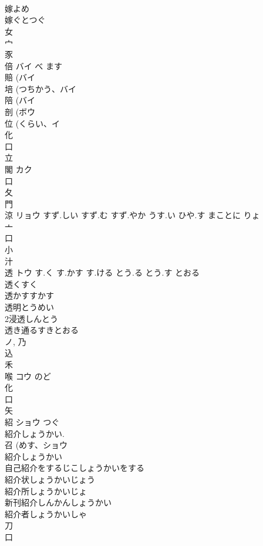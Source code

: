 \documentclass[8pt]{extreport}
\begin{document}
\begin{CJK}{UTF8}{min}
\\	嫁よめ
\\	嫁ぐとつぐ
\\	女 
\\	宀 
\\	豕 
\\	倍	バイ	べ ます	
\\	賠 (バイ 
\\	培 (つちかう、バイ 
\\	陪 (バイ 
\\	剖 (ボウ 
\\	位 (くらい、イ 
\\	化 
\\	口 
\\	立 
\\	閣	カク		
\\	口 
\\	夂 
\\	門 
\\	涼	リョウ	すず.しい すず.む すず.やか うす.い ひや.す まことに りょ	
\\	亠 
\\	口 
\\	小 
\\	汁 
\\	透	トウ	す.く す.かす す.ける とう.る とう.す とおる	
\\	透くすく
\\	透かすすかす
\\	透明とうめい
\\	2浸透しんとう
\\	透き通るすきとおる
\\	ノ, 乃 
\\	込 
\\	禾 
\\	喉	コウ	のど	
\\	化 
\\	口 
\\	矢 
\\	紹	ショウ	つぐ	
\\	紹介しょうかい. 
\\	召 (めす、ショウ 
\\	紹介しょうかい 
\\	自己紹介をするじこしょうかいをする 
\\	紹介状しょうかいじょう 
\\	紹介所しょうかいじょ 
\\	新刊紹介しんかんしょうかい 
\\	紹介者しょうかいしゃ 
\\	刀 
\\	口 

\end{CJK}
\end{document}
